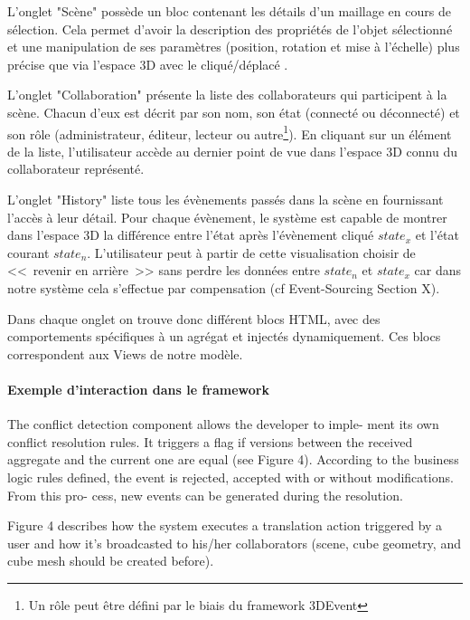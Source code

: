 L'onglet "Scène" possède un bloc contenant les détails d'un maillage en cours de 
sélection. Cela permet d'avoir la description des propriétés de l'objet sélectionné et 
une manipulation de ses paramètres (position, rotation et mise à l'échelle) plus 
précise que via l'espace 3D avec le cliqué/déplacé .

L'onglet "Collaboration" présente la liste des collaborateurs qui participent à la 
scène. Chacun d'eux est décrit par son nom, son état  (connecté ou déconnecté) 
et son rôle (administrateur, éditeur, lecteur ou autre\footnote{Un rôle peut être 
	défini par le biais du \gls{framework} 3DEvent}). En cliquant sur un élément de 
	la 
liste, l'utilisateur accède au dernier point de vue dans l'espace 3D connu du 
collaborateur représenté.

L'onglet "History" liste tous les évènements passés dans la scène en fournissant 
l'accès à leur détail. Pour chaque évènement, le système est capable de montrer 
dans l'espace 3D la différence entre l'état  après l'évènement cliqué $state_x$ et 
l'état courant $state_n$. L'utilisateur peut à partir de cette visualisation choisir de 
<<~revenir en arrière~>> sans perdre les données entre $state_n$ et $state_x$ 
car dans notre système cela s'effectue par compensation (cf Event-Sourcing 
Section X).

Dans chaque onglet on trouve donc différent blocs \gls{HTML}, avec des 
comportements spécifiques à un agrégat et injectés dynamiquement. Ces blocs 
correspondent aux Views de notre modèle.
\paragraph{Exemple d'interaction dans le framework}
The conflict detection component allows the developer to imple- ment its own 
conflict resolution rules. It triggers a flag if versions between the received 
aggregate and the current one are equal (see Figure 4). According to the business 
logic rules defined, the event is rejected, accepted with or without modifications. 
From this pro- cess, new events can be generated during the resolution.

Figure 4 describes how the system executes a translation action triggered by a 
user and how it’s broadcasted to his/her collaborators (scene, cube geometry, and 
cube mesh should be created before). 

